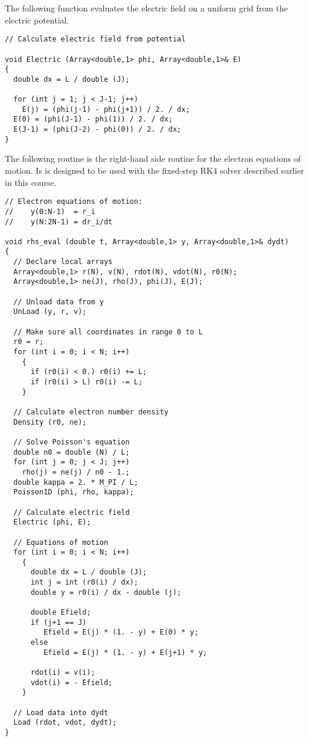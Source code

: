 The following function evaluates the electric field on a uniform grid
from the electric potential.
\begin{verbatim}
// Calculate electric field from potential

void Electric (Array<double,1> phi, Array<double,1>& E)
{
  double dx = L / double (J);

  for (int j = 1; j < J-1; j++)
    E(j) = (phi(j-1) - phi(j+1)) / 2. / dx;
  E(0) = (phi(J-1) - phi(1)) / 2. / dx;
  E(J-1) = (phi(J-2) - phi(0)) / 2. / dx;
}
\end{verbatim}

The following routine is the right-hand side routine for the electron
equations of motion. Is is designed to be used with the fixed-step
RK4 solver described earlier in this course.
\begin{verbatim}
// Electron equations of motion:
//    y(0:N-1)  = r_i
//    y(N:2N-1) = dr_i/dt

void rhs_eval (double t, Array<double,1> y, Array<double,1>& dydt)
{
  // Declare local arrays
  Array<double,1> r(N), v(N), rdot(N), vdot(N), r0(N);
  Array<double,1> ne(J), rho(J), phi(J), E(J);

  // Unload data from y
  UnLoad (y, r, v);

  // Make sure all coordinates in range 0 to L
  r0 = r;
  for (int i = 0; i < N; i++)
    {
      if (r0(i) < 0.) r0(i) += L;
      if (r0(i) > L) r0(i) -= L;
    }

  // Calculate electron number density
  Density (r0, ne);

  // Solve Poisson's equation
  double n0 = double (N) / L;
  for (int j = 0; j < J; j++)
    rho(j) = ne(j) / n0 - 1.;
  double kappa = 2. * M_PI / L; 
  Poisson1D (phi, rho, kappa);

  // Calculate electric field
  Electric (phi, E);

  // Equations of motion
  for (int i = 0; i < N; i++)
    {
      double dx = L / double (J);
      int j = int (r0(i) / dx);
      double y = r0(i) / dx - double (j);
      
      double Efield;
      if (j+1 == J)
         Efield = E(j) * (1. - y) + E(0) * y;
      else
         Efield = E(j) * (1. - y) + E(j+1) * y;

      rdot(i) = v(i);
      vdot(i) = - Efield;
    }

  // Load data into dydt
  Load (rdot, vdot, dydt);
}
\end{verbatim}


